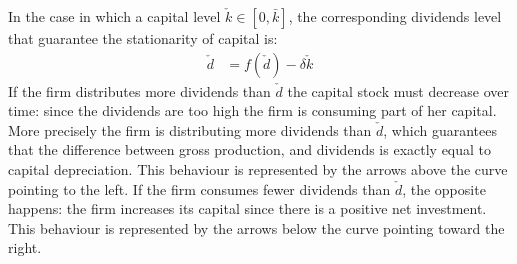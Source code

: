 \documentclass[12pt]{article}
\begin{document}
In the case in which a capital level \(\check{k} \in \left[0,\bar{k} \right]\), the corresponding dividends level that
guarantee the stationarity of capital is:
\begin{align}
    \check{d} &= f(\check{d}) -\delta \check{k}
\end{align}
If the firm distributes more dividends than \(\check{d}\) the capital stock must decrease over time: since the
dividends are too high the firm is consuming part of her capital. More precisely the firm is distributing more dividends than
\(\check{d}\), which guarantees that the difference between gross production, and dividends is exactly equal to capital depreciation.
This behaviour is represented by the arrows above the curve pointing to the left. If the firm consumes fewer
dividends than \(\check{d}\), the opposite happens: the firm increases its capital since there is a positive net
investment. This behaviour is represented by
the arrows below the curve pointing toward the right. 
\end{document}
